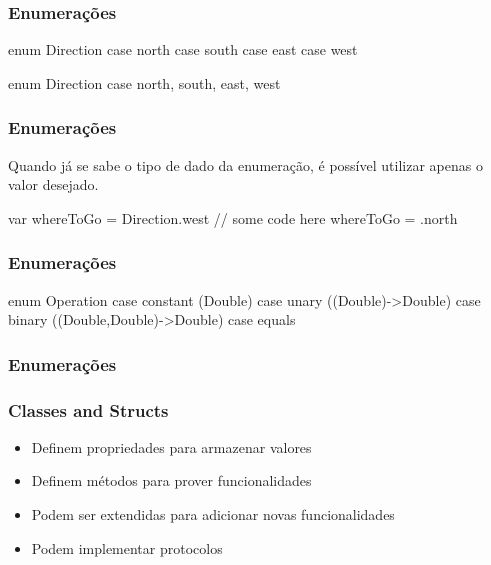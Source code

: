 \begin{frame}[fragile]
    \frametitle{Enumerações}

    \begin{swift}
        enum Direction {
            case north
            case south
            case east
            case west
        }

        enum Direction {
            case north, south, east, west
        }
    \end{swift}
\end{frame}

\begin{frame}[fragile]
    \frametitle{Enumerações}

    Quando já se sabe o tipo de dado da enumeração, é possível
    utilizar apenas o valor desejado.
    \vspace{0.5cm}
    \begin{swift}
        var whereToGo = Direction.west
        // some code here
        whereToGo = .north
    \end{swift}
\end{frame}

\begin{frame}[fragile]
    \frametitle{Enumerações}

    \begin{swift}
        enum Operation {
            case constant (Double)
            case unary ((Double)->Double)
            case binary ((Double,Double)->Double)
            case equals
        }
    \end{swift}
\end{frame}

\begin{frame}[fragile]
    \frametitle{Enumerações}

\end{frame}

\begin{frame}[fragile]
    \frametitle{Classes and Structs}

    \begin{itemize}
        \item Definem propriedades para armazenar valores
        \item Definem métodos para prover funcionalidades
        \item Podem ser extendidas para adicionar novas funcionalidades
        \item Podem implementar protocolos
    \end{itemize}
\end{frame}

